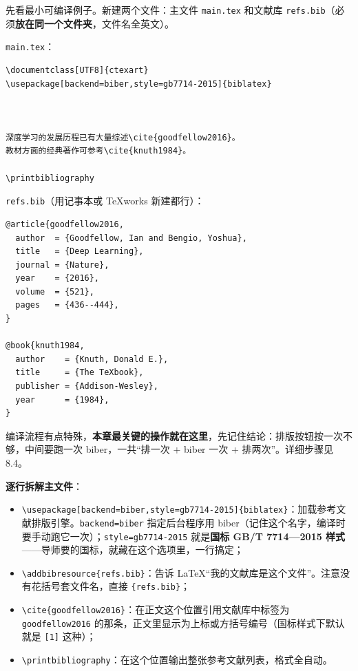 先看最小可编译例子。新建两个文件：主文件 \texttt{main.tex} 和文献库 \texttt{refs.bib}（必须\textbf{放在同一个文件夹}，文件名全英文）。

\texttt{main.tex}：

\begin{lstlisting}
\documentclass[UTF8]{ctexart}
\usepackage[backend=biber,style=gb7714-2015]{biblatex}



深度学习的发展历程已有大量综述\cite{goodfellow2016}。
教材方面的经典著作可参考\cite{knuth1984}。

\printbibliography

\end{lstlisting}

\texttt{refs.bib}（用记事本或 TeXworks 新建都行）：

\begin{lstlisting}
@article{goodfellow2016,
  author  = {Goodfellow, Ian and Bengio, Yoshua},
  title   = {Deep Learning},
  journal = {Nature},
  year    = {2016},
  volume  = {521},
  pages   = {436--444},
}

@book{knuth1984,
  author    = {Knuth, Donald E.},
  title     = {The TeXbook},
  publisher = {Addison-Wesley},
  year      = {1984},
}
\end{lstlisting}

编译流程有点特殊，\textbf{本章最关键的操作就在这里}，先记住结论：排版按钮按一次不够，中间要跑一次 biber，一共“排一次 + biber 一次 + 排两次”。详细步骤见 8.4。

\textbf{逐行拆解主文件}：

\begin{itemize}
\setlength{\itemsep}{2pt}
\item \texttt{\textbackslash{}usepackage[backend=biber,style=gb7714-2015]\{biblatex\}}：加载参考文献排版引擎。\texttt{backend=biber} 指定后台程序用 biber（记住这个名字，编译时要手动跑它一次）；\texttt{style=gb7714-2015} 就是\textbf{国标 GB/T 7714—2015 样式}——导师要的国标，就藏在这个选项里，一行搞定；
\item \texttt{\textbackslash{}addbibresource\{refs.bib\}}：告诉 LaTeX“我的文献库是这个文件”。注意没有花括号套文件名，直接 \texttt{\{refs.bib\}}；
\item \texttt{\textbackslash{}cite\{goodfellow2016\}}：在正文这个位置引用文献库中标签为 \texttt{goodfellow2016} 的那条，正文里显示为上标或方括号编号（国标样式下默认就是 \texttt{[1]} 这种）；
\item \texttt{\textbackslash{}printbibliography}：在这个位置输出整张参考文献列表，格式全自动。
\end{itemize}

